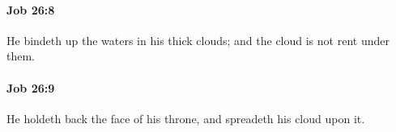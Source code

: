 		\paragraph{Job 26:8} %
			\label{JOB-26-8}

			He bindeth up the waters in his thick clouds; and the cloud is not rent under them.


		\paragraph{Job 26:9} %
			\label{JOB-26-9}

			He holdeth back the face of his throne, and spreadeth his cloud upon it.


